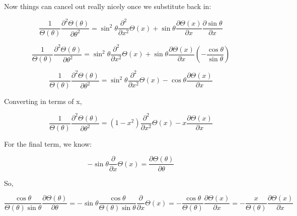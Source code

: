 \documentclass[12pt]{article}
\renewcommand{\_}{\kern-1.5pt\textunderscore\kern-1.5pt}
\begin{document}
Now things can cancel out really nicely once we substitute back in:\par

 \[ \frac{1}{ \Theta  \left(  \theta  \right) }\frac{ \partial ^{2} \Theta  \left(  \theta  \right) }{ \partial  \theta ^{2}}=\sin ^{2} \theta \frac{ \partial ^{2}}{ \partial x^{2}} \Theta  \left( x \right) +\sin  \theta \frac{ \partial  \Theta  \left( x \right) }{ \partial x}\frac{ \partial \sin  \theta }{ \partial x} \] \par

 \[ \frac{1}{ \Theta  \left(  \theta  \right) }\frac{ \partial ^{2} \Theta  \left(  \theta  \right) }{ \partial  \theta ^{2}}=\sin ^{2} \theta \frac{ \partial ^{2}}{ \partial x^{2}} \Theta  \left( x \right) +\sin  \theta \frac{ \partial  \Theta  \left( x \right) }{ \partial x} \left( -\frac{\cos  \theta }{\sin  \theta } \right)  \] \par

 \[ \frac{1}{ \Theta  \left(  \theta  \right) }\frac{ \partial ^{2} \Theta  \left(  \theta  \right) }{ \partial  \theta ^{2}}=\sin ^{2} \theta \frac{ \partial ^{2}}{ \partial x^{2}} \Theta  \left( x \right) -\cos  \theta \frac{ \partial  \Theta  \left( x \right) }{ \partial x} \] \par

Converting in terms of x,\par

 \[ \frac{1}{ \Theta  \left(  \theta  \right) }\frac{ \partial ^{2} \Theta  \left(  \theta  \right) }{ \partial  \theta ^{2}}= \left( 1-x^{2} \right) \frac{ \partial ^{2}}{ \partial x^{2}} \Theta  \left( x \right) -x\frac{ \partial  \Theta  \left( x \right) }{ \partial x} \] \par

For the final term, we know:\par

 \[ -\sin  \theta \frac{ \partial }{ \partial x} \Theta  \left( x \right) =\frac{ \partial  \Theta  \left(  \theta  \right) }{ \partial  \theta } \] \par

So,\par

 \[ \frac{\cos  \theta }{ \Theta  \left(  \theta  \right) \sin  \theta }\frac{ \partial  \Theta  \left(  \theta  \right) }{ \partial  \theta }=-\sin  \theta \frac{\cos  \theta }{ \Theta  \left(  \theta  \right) \sin  \theta }\frac{ \partial }{ \partial x} \Theta  \left( x \right) =-\frac{\cos  \theta }{ \Theta  \left(  \theta  \right) }\frac{ \partial  \Theta  \left( x \right) }{ \partial x}=-\frac{x}{ \Theta  \left(  \theta  \right) }\frac{ \partial  \Theta  \left( x \right) }{ \partial x} \] \par
\end{document}
